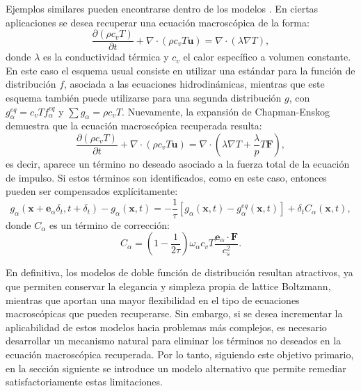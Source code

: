 Ejemplos similares pueden encontrarse dentro de los modelos \pp{} \cite{li_effect_2014}. En ciertas aplicaciones se desea recuperar una ecuaci\'on macrosc\'opica de la forma:
\begin{equation}
	\dfrac{\partial (\rho c_v T)}{\partial t} + \nabla \cdot (\rho c_v T \bm{u}) = \nabla \cdot (\lambda \nabla T),
\end{equation}
donde $\lambda$ es la conductividad t\'ermica y $c_v$ el calor espec\'ifico a volumen constante. En este caso el esquema usual consiste en utilizar una \lbe{} \pp{} est\'andar para la funci\'on de distribuci\'on $f$, asociada a las ecuaciones hidrodin\'amicas, mientras que este esquema tambi\'en puede utilizarse para una segunda distribuci\'on $g$, con $g^{eq}_{\alpha} = c_v T f^{eq}_{\alpha}$ y $\sum g_{\alpha} = \rho c_v T$. Nuevamente, la expansi\'on de Chapman-Enskog demuestra que la ecuaci\'on macrosc\'opica recuperada resulta:
\begin{equation}
	\dfrac{\partial (\rho c_v T)}{\partial t} + \nabla \cdot (\rho c_v T \bm{u}) = \nabla \cdot \left(\lambda \nabla T + \dfrac{\lambda}{p}T\bm{F} \right),
	\label{eq:e_macro_F}
\end{equation}
es decir, aparece un t\'ermino no deseado asociado a la fuerza total de la ecuaci\'on de impulso. Si estos t\'erminos son identificados, como en este caso, entonces pueden ser compensados expl\'icitamente:
\begin{equation}
	g_{\alpha}(\bm{x}+\bm{e}_{\alpha}\delta_t, t+\delta_t) - g_{\alpha}(\bm{x},t) = -\dfrac{1}{\tau} \left[ g_{\alpha}(\bm{x},t) - g^{eq}_{\alpha}(\bm{x},t) \right] + \delta_t C_{\alpha}(\bm{x},t),
\end{equation}
donde $C_{\alpha}$ es un t\'ermino de correcci\'on:
\begin{equation}
	C_{\alpha} = \left( 1-\dfrac{1}{2\tau} \right)\omega_{\alpha}c_v T \dfrac{\bm{e}_{\alpha} \cdot \bm{F}}{c_s^2}.
\end{equation}

En definitiva, los modelos de doble funci\'on de distribuci\'on resultan atractivos, ya que permiten conservar la elegancia y simpleza propia de lattice Boltzmann, mientras que aportan una mayor flexibilidad en el tipo de ecuaciones macrosc\'opicas que pueden recuperarse. Sin embargo, si se desea incrementar la aplicabilidad de estos modelos hacia problemas m\'as complejos, es necesario desarrollar un mecanismo natural para eliminar los t\'erminos no deseados en la ecuaci\'on macrosc\'opica recuperada. Por lo tanto, siguiendo este objetivo primario, en la secci\'on siguiente se introduce un modelo alternativo que permite remediar satisfactoriamente estas limitaciones.


